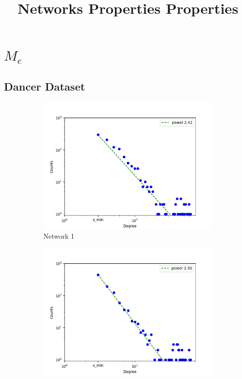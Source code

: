 \documentclass[a4paper, 12pt]{article}
\title{Networks Properties Properties}
\begin{document}
\maketitle
\tableofcontents

\clearpage

\section{$M_e$}
\subsection{Dancer Dataset}
\clearpage

    \begin{figure}
        \centering
        \begin{subfigure}[b]{0.475\textwidth}
            \centering
            \includegraphics[width=\textwidth]{img/corpus/dancer_1/figure_1}
            \caption[Network2]%
            {{\small Network 1}}    
            \label{fig:mean and std of net14}
        \end{subfigure}
        \hfill
        \begin{subfigure}[b]{0.475\textwidth}  
            \centering 
            \includegraphics[width=\textwidth]{img/corpus/dancer_2/figure_1}

\end{subfigure}
\end{figure}
\end{document}
